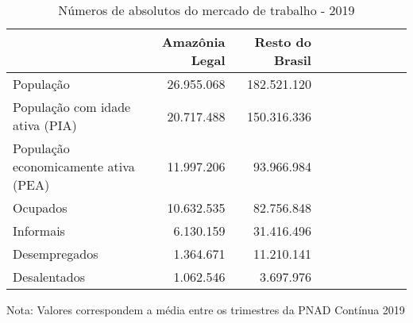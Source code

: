 \begin{table}[H]
\centering
\label{\_retrato\_emprego\_caracterizacao\_table}
\begin{threeparttable}
\caption{Números de absolutos do mercado de trabalho - 2019}
\begin{tabular}{l*{3}{rrr}}
\midrule \midrule
                    &Amazônia Legal&Resto do Brasil\\
\midrule
População         &  26.955.068& 182.521.120\\
População com idade ativa (PIA)&  20.717.488& 150.316.336\\
População economicamente ativa (PEA)&  11.997.206&  93.966.984\\
Ocupados            &  10.632.535&  82.756.848\\
Informais           &   6.130.159&  31.416.496\\
Desempregados       &   1.364.671&  11.210.141\\
Desalentados        &   1.062.546&   3.697.976\\
\bottomrule
\end{tabular}
\begin{tablenotes}
\scriptsize{Nota: Valores correspondem a média entre os trimestres da PNAD Contínua 2019}
\end{tablenotes}
\end{threeparttable}
\end{table}
